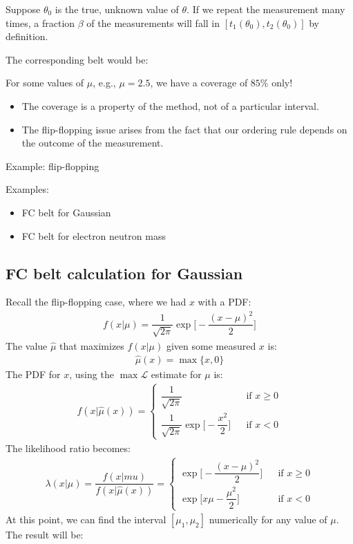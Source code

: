Suppose $\theta_0$ is the true, unknown value of $\theta$. If we repeat the measurement many times, a fraction $\beta$ of the measurements will fall in $[t_1(\theta_0), t_2(\theta_0)]$ by definition. 

The corresponding belt would be: 

For some values of $\mu$, e.g., $\mu=2.5$, we have a coverage of $85\%$ only!

\begin{itemize}[$\to$]
    \item The coverage is a property of the method, not of a particular interval. 
    \item The flip-flopping issue arises from the fact that our ordering rule depends on the outcome of the measurement. 
\end{itemize}

Example: flip-flopping

Examples: \begin{itemize}[$\to$]
    \item FC belt for Gaussian 
    \item FC belt for electron neutron mass
\end{itemize}

\subsection{FC belt calculation for Gaussian} 
Recall the flip-flopping case, where we had $x$ with a PDF: 
\begin{align}
    f(x|\mu) = \dfrac{1}{\sqrt{2\pi}} \exp \Big[- \dfrac{(x-\mu)^2}{2}\Big]
\end{align}
The value $\hat{\mu}$ that maximizes $f(x|\mu)$ given some measured $x$ is: 
\begin{align}
    \hat{\mu}(x) = \max\{x,0\}
\end{align}
The PDF for $x$, using the $\max \mathcal{L}$ estimate for $\mu$ is: 
\begin{align}
    f(x|\hat{\mu}(x)) = \left\{
    \begin{array}{lcl}
       \dfrac{1}{\sqrt{2\pi}}  & & {\textrm{if } x \geq 0} \\
        \dfrac{1}{\sqrt{2\pi}} \exp\Big[-\dfrac{x^2}{2}\Big] & & {\textrm{if } x < 0} 
    \end{array} \right.
\end{align}
The likelihood ratio becomes: 
\begin{align}
    \lambda(x|\mu) = \dfrac{f(x|mu)}{f(x|\hat{\mu}(x))} = \left\{
    \begin{array}{lcl}
         \exp\Big[ -\dfrac{(x-\mu)^2}{2}\Big]& & {\textrm{if } x \geq 0}  \\
         \exp\Big[x\mu - \dfrac{\mu^2}{2}\Big]& & {\textrm{if } x < 0}
    \end{array} \right.
\end{align}
At this point, we can find the interval $[\mu_1, \mu_2]$ numerically for any value of $\mu$. The result will be: 
\todo

